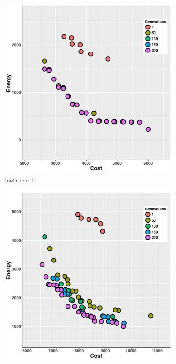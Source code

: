 \begin{figure}
   \centering
   \begin{subfigure}[b]{0.45\textwidth} \includegraphics[width=\textwidth]{pics/preliminary/without/testCase1_.png}
   \caption{Instance 1}
   \label{fig:a}
   \end{subfigure}
   \begin{subfigure}[b]{0.45\textwidth} \includegraphics[width=\textwidth]{pics/preliminary/without/testCase2_.png}

\end{subfigure}
\end{figure}
